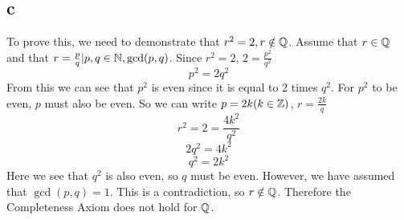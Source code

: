 \documentclass[12pt]{article}
\begin{document}
\subsection{c}
To prove this, we need to demonstrate that $r^2 = 2, r \notin \mathbb{Q}$.
\newline
Assume that $r \in \mathbb{Q}$ and that $r = \frac{p}{q}| p,q \in \mathbb{N}, \gcd(p,q)$. Since $r^2 = 2$, $2 = \frac{p^2}{q^2}$
$$p^2 = 2 q^2$$
From this we can see that $p^2$ is even since it is equal to 2 times $q^2$. For $p^2$ to be even, $p$ must also be even. So we can write $p = 2k( k \in \mathbb{Z})$, $r = \frac{2k}{q}$
$$r^2 = 2 = \frac{4k^2}{q^2}$$
$$2q^2 = 4k^2$$
$$q^2 = 2k^2$$
Here we see that $q^2$ is also even, so $q$ must be even. However, we have assumed that $\gcd(p,q)=1$. This is a contradiction, so $r \notin \mathbb{Q}$.
\newline
Therefore the Completeness Axiom does not hold for $\mathbb{Q}$.
\end{document}
